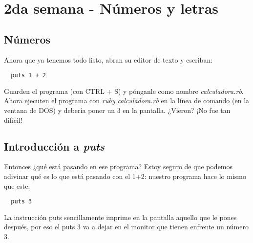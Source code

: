 \chapter{2da semana - Números y letras}

\section{Números}
Ahora que ya tenemos todo listo, abran su editor de texto y escriban:

\begin{lstlisting}
  puts 1 + 2
\end{lstlisting}

Guarden el programa (con CTRL + S) y pónganle como nombre \emph{calculadora.rb}. Ahora ejecuten el programa con \emph{ruby calculadora.rb} en la línea de comando (en la ventana de DOS) y debería poner un 3 en la pantalla. ¿Vieron? ¡No fue tan difícil!

\section{Introducción a \emph{puts}}
Entonces ¿qué está pasando en ese programa? Estoy seguro de que podemos adivinar qué es lo que está pasando con el 1+2: nuestro programa hace lo mismo que este:

\begin{lstlisting}
  puts 3
\end{lstlisting}

La instrucción puts sencillamente imprime en la pantalla aquello que le pones después, por eso el puts 3 va a dejar en el monitor que tienen enfrente un número 3.

